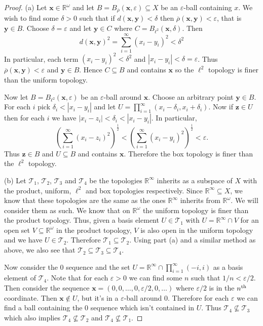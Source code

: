 \documentclass{article}
\begin{document}
\begin{proof}
(a) Let $\mathbf{x} \in \mathbb{R}^{\omega}$ and let $B = B_{\overline{\rho}}(\mathbf{x}, \varepsilon) \subseteq X$ be an $\varepsilon$-ball containing $x$. We wish to find some $\delta > 0$ such that if $d(\mathbf{x}, \mathbf{y}) < \delta$ then $\overline{\rho}(\mathbf{x}, \mathbf{y}) < \varepsilon$, that is $\mathbf{y} \in B$. Choose $\delta = \varepsilon$ and let $\mathbf{y} \in C$ where $C = B_{\ell^2}(\mathbf{x}, \delta)$. Then
\[
d(\mathbf{x},\mathbf{y})^2 = \sum_{i=1}^{\infty} (x_i-y_i)^2 < \delta^2
\]
In particular, each term $(x_i - y_i)^2 < \delta^2$ and $|x_i-y_i| < \delta = \varepsilon$. Thus $\overline{\rho}(\mathbf{x},\mathbf{y}) < \varepsilon$ and $\mathbf{y} \in B$. Hence $C \subseteq B$ and contains $\mathbf{x}$ so the $\ell^2$ topology is finer than the uniform topology.

Now let $B = B_{\ell^2}(\mathbf{x},\varepsilon)$ be an $\varepsilon$-ball around $\mathbf{x}$. Choose an arbitrary point $\mathbf{y} \in B$. For each $i$ pick $\delta_i < |x_i-y_i|$ and let $U = \prod_{i=1}^{\infty} (x_i-\delta_i, x_i+\delta_i)$. Now if $\mathbf{z} \in U$ then for each $i$ we have $|x_i-z_i| < \delta_i < |x_i-y_i|$. In particular,
\[
\left (\sum_{i=1}^{\infty} (x_i-z_i)^2 \right )^{\frac{1}{2}} < \left (\sum_{i=1}^{\infty} (x_i-y_i)^2 \right )^{\frac{1}{2}} < \varepsilon.
\]
Thus $\mathbf{z} \in B$ and $U \subseteq B$ and contains $\mathbf{x}$. Therefore the box topology is finer than the $\ell^2$ topology.

(b) Let $\mathcal{T}_1$, $\mathcal{T}_2$, $\mathcal{T}_3$ and $\mathcal{T}_4$ be the topologies $\mathbb{R}^{\infty}$ inherits as a subspace of $X$ with the product, uniform, $\ell^2$ and box topologies respectively. Since $\mathbb{R}^{\infty} \subseteq X$, we know that these topologies are the same as the ones $\mathbb{R}^{\infty}$ inherits from $\mathbb{R}^{\omega}$. We will consider them as such. We know that on $\mathbb{R}^{\omega}$ the uniform topology is finer than the product topology. Thus, given a basis element $U \in \mathcal{T}_1$ with $U = \mathbb{R}^{\infty} \cap V$ for an open set $V \subseteq \mathbb{R}^{\omega}$ in the product topology, $V$ is also open in the uniform topology and we have $U \in \mathcal{T}_2$. Therefore $\mathcal{T}_1 \subseteq \mathcal{T}_2$. Using part (a) and a similar method as above, we also see that $\mathcal{T}_2 \subseteq \mathcal{T}_3 \subseteq \mathcal{T}_4$.

Now consider the $0$ sequence and the set $U = \mathbb{R}^{\infty} \cap \prod_{i=1}^{\infty} (-i,i)$ as a basis element of $\mathcal{T}_4$. Note that for each $\varepsilon > 0$ we can find some $n$ such that $1/n < \varepsilon/2$. Then consider the sequence $\mathbf{x} = (0,0, \dots , 0, \varepsilon/2, 0, \dots )$ where $\varepsilon/2$ is in the $n^{\textup{th}}$ coordinate. Then $\mathbf{x} \notin U$, but it's in a $\varepsilon$-ball around $0$. Therefore for each $\varepsilon$ we can find a ball containing the $0$ sequence which isn't contained in $U$. Thus $\mathcal{T}_4 \nsubseteq \mathcal{T}_3$ which also implies $\mathcal{T}_4 \nsubseteq \mathcal{T}_2$ and $\mathcal{T}_4 \nsubseteq \mathcal{T}_1$.


\end{proof}
\end{document}
